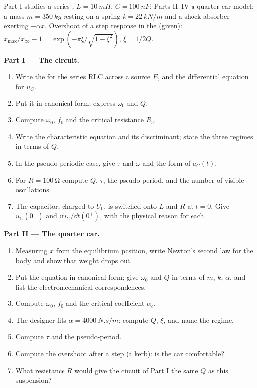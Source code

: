 \begin{problem}
\label{pb:b1:transient-regimes:1}
Part I studies a series , $L = \qty{10}{mH}$, $C = \qty{100}{nF}$;
Parts II--IV a quarter-car model: a mass $m = \qty{350}{kg}$ resting on a
spring $k = \qty{22}{kN/m}$ and a shock absorber exerting $-\alpha\dot x$.
Overshoot of a step response in the  (given):
$x_{\max}/x_\infty - 1 = \exp(-\pi\xi/\sqrt{1 - \xi^2})$, $\xi = 1/2Q$.

\medskip
\noindent\textbf{Part I --- The circuit.}
\begin{enumerate}
  \item Write the  for the series RLC across a source $E$, and
        the differential equation for $u_C$.
  \item Put it in canonical form; express $\omega_0$ and $Q$.
  \item Compute $\omega_0$, $f_0$ and the critical resistance $R_c$.
  \item Write the characteristic equation and its discriminant; state
        the three regimes in terms of $Q$.
  \item In the pseudo-periodic case, give $\tau$ and $\omega$ and the
        form of $u_C(t)$.
  \item For $R = \qty{100}{\ohm}$ compute $Q$, $\tau$, the pseudo-period,
        and the number of visible oscillations.
  \item The capacitor, charged to $U_0$, is switched onto $L$ and $R$
        at $t = 0$. Give $u_C(0^+)$ and $\dd u_C/\dd t(0^+)$, with the
        physical reason for each.
\end{enumerate}

\medskip
\noindent\textbf{Part II --- The quarter car.}
\begin{enumerate}[resume]
  \item Measuring $x$ from the equilibrium position, write Newton's
        second law for the body and show that weight drops out.
  \item Put the equation in canonical form; give $\omega_0$ and $Q$ in
        terms of $m$, $k$, $\alpha$, and list the electromechanical
        correspondences.
  \item Compute $\omega_0$, $f_0$ and the critical coefficient
        $\alpha_c$.
  \item The designer fits $\alpha = \qty{4000}{N.s/m}$: compute $Q$,
        $\xi$, and name the regime.
  \item Compute $\tau$ and the pseudo-period.
  \item Compute the overshoot after a step (a kerb): is the car
        comfortable?
  \item What resistance $R$ would give the circuit of Part I the same
        $Q$ as this suspension?
\end{enumerate}


\end{problem}
